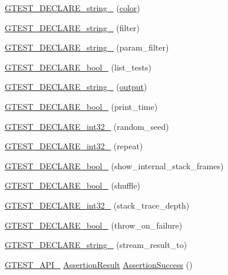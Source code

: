 \begin{DoxyCompactItemize}
\hyperlink{namespacetesting_a0f658c915a1e60996a2ab00a06612723}{G\-T\-E\-S\-T\-\_\-\-D\-E\-C\-L\-A\-R\-E\-\_\-string\-\_\-} (\hyperlink{core__c_8h_a4ea898fa4dd23d613d19923509d8e249}{color})
\item 
\hyperlink{namespacetesting_a20d69860ce843142c7f740262e6b0c9a}{G\-T\-E\-S\-T\-\_\-\-D\-E\-C\-L\-A\-R\-E\-\_\-string\-\_\-} (filter)
\item 
\hyperlink{namespacetesting_add66c434db4fb5198931422ca7226dbd}{G\-T\-E\-S\-T\-\_\-\-D\-E\-C\-L\-A\-R\-E\-\_\-string\-\_\-} (param\-\_\-filter)
\item 
\hyperlink{namespacetesting_af2cd3595c571ca408afc337bc4bb2619}{G\-T\-E\-S\-T\-\_\-\-D\-E\-C\-L\-A\-R\-E\-\_\-bool\-\_\-} (list\-\_\-tests)
\item 
\hyperlink{namespacetesting_a3fe54dd551f1c36cfdd1b36cd6881a44}{G\-T\-E\-S\-T\-\_\-\-D\-E\-C\-L\-A\-R\-E\-\_\-string\-\_\-} (\hyperlink{legacy_8hpp_ad2a91d797896d7d86e0c03dc705a4abc}{output})
\item 
\hyperlink{namespacetesting_aeccefd463a0942da24750e1bbee76041}{G\-T\-E\-S\-T\-\_\-\-D\-E\-C\-L\-A\-R\-E\-\_\-bool\-\_\-} (print\-\_\-time)
\item 
\hyperlink{namespacetesting_ae754999b59509808254d39e3a3cf38e0}{G\-T\-E\-S\-T\-\_\-\-D\-E\-C\-L\-A\-R\-E\-\_\-int32\-\_\-} (random\-\_\-seed)
\item 
\hyperlink{namespacetesting_a315ef0647e4f2795bf1705de8e9c9659}{G\-T\-E\-S\-T\-\_\-\-D\-E\-C\-L\-A\-R\-E\-\_\-int32\-\_\-} (repeat)
\item 
\hyperlink{namespacetesting_af37b9206b938bb8b7d398a1379eb7482}{G\-T\-E\-S\-T\-\_\-\-D\-E\-C\-L\-A\-R\-E\-\_\-bool\-\_\-} (show\-\_\-internal\-\_\-stack\-\_\-frames)
\item 
\hyperlink{namespacetesting_a6d87f7374e105483905a305328856f4b}{G\-T\-E\-S\-T\-\_\-\-D\-E\-C\-L\-A\-R\-E\-\_\-bool\-\_\-} (shuffle)
\item 
\hyperlink{namespacetesting_adba6f8afa0f8695956d0134f1629a10b}{G\-T\-E\-S\-T\-\_\-\-D\-E\-C\-L\-A\-R\-E\-\_\-int32\-\_\-} (stack\-\_\-trace\-\_\-depth)
\item 
\hyperlink{namespacetesting_ac69f2aeeb84dc5f49bd3d040a6f32d17}{G\-T\-E\-S\-T\-\_\-\-D\-E\-C\-L\-A\-R\-E\-\_\-bool\-\_\-} (throw\-\_\-on\-\_\-failure)
\item 
\hyperlink{namespacetesting_ad4d1ea63037fc21018dbe997cb0041d1}{G\-T\-E\-S\-T\-\_\-\-D\-E\-C\-L\-A\-R\-E\-\_\-string\-\_\-} (stream\-\_\-result\-\_\-to)
\item 
\hyperlink{ts__gtest_8h_aa73be6f0ba4a7456180a94904ce17790}{G\-T\-E\-S\-T\-\_\-\-A\-P\-I\-\_\-} \hyperlink{classtesting_1_1AssertionResult}{Assertion\-Result} \hyperlink{namespacetesting_a74a3d26c1286bd4d7c189c5dff2483ab}{Assertion\-Success} ()

\end{DoxyCompactItemize}
